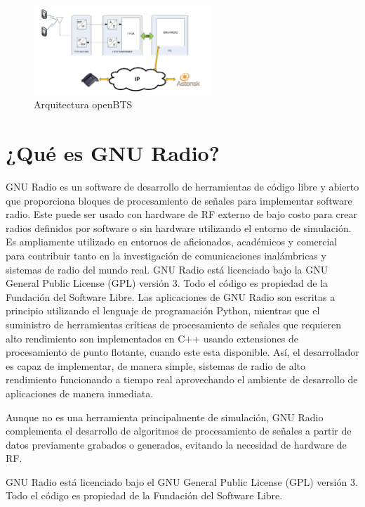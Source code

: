 \begin{figure}[htb]
\centering
\includegraphics[width=0.6\textwidth]{capitulo1/openBTS.png}
\caption{Arquitectura openBTS}
\label{cap1:003}
\end{figure}



\section{¿Qué es GNU Radio?}

GNU Radio es un software de desarrollo de herramientas de código libre y abierto que proporciona bloques de procesamiento de señales para implementar software radio. Este puede ser usado con hardware de RF externo de bajo costo para crear radios definidos por software o sin hardware utilizando el entorno de simulación. Es ampliamente utilizado en entornos de aficionados, académicos y comercial para contribuir tanto en la investigación de comunicaciones inalámbricas y sistemas de radio del mundo real.
GNU Radio está licenciado bajo la GNU General Public License (GPL) versión 3. Todo el código es propiedad de la Fundación del Software Libre.
Las aplicaciones de GNU Radio son escritas a principio utilizando el lenguaje de programación Python, mientras que el suministro de herramientas críticas de procesamiento de señales que requieren alto rendimiento son implementados en C++ usando extensiones de procesamiento de punto flotante, cuando este esta disponible. Así, el desarrollador es capaz de implementar, de manera simple, sistemas de radio de alto rendimiento funcionando a tiempo real aprovechando el ambiente de desarrollo de aplicaciones de manera inmediata.

Aunque no es una herramienta principalmente de simulación, GNU Radio complementa el desarrollo de algoritmos de procesamiento de señales a partir de datos previamente grabados o generados, evitando la necesidad de hardware de RF.

GNU Radio está licenciado bajo el GNU General Public License (GPL) versión 3. Todo el código es propiedad de la Fundación del Software Libre.

